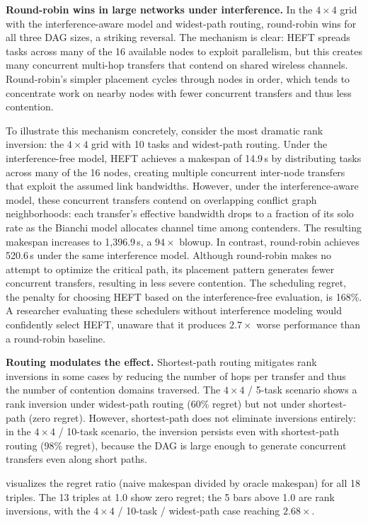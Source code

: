 \documentclass[conference]{IEEEtran}
\begin{document}
\textbf{Round-robin wins in large networks under interference.}
In the $4\times4$ grid with the interference-aware model and widest-path routing,
round-robin wins for all three DAG sizes, a striking reversal.  The
mechanism is clear: HEFT spreads tasks across many of the 16 available
nodes to exploit parallelism, but this creates many concurrent multi-hop
transfers that contend on shared wireless channels.  Round-robin's simpler
placement cycles through nodes in order, which tends to concentrate work
on nearby nodes with fewer concurrent transfers and thus less contention.

To illustrate this mechanism concretely, consider the most dramatic rank
inversion: the $4\times4$ grid with 10 tasks and widest-path routing.
Under the interference-free model, HEFT achieves a makespan of 14.9\,s by
distributing tasks across many of the 16 nodes, creating multiple concurrent
inter-node transfers that exploit the assumed link bandwidths.  However,
under the interference-aware model, these concurrent transfers contend on overlapping
conflict graph neighborhoods: each transfer's effective bandwidth drops to
a fraction of its solo rate as the Bianchi model allocates channel time
among contenders.  The resulting makespan increases to
1,396.9\,s, a $94\times$ blowup.  In contrast, round-robin achieves
520.6\,s under the same interference model.  Although round-robin makes no
attempt to optimize the critical path, its placement pattern generates fewer
concurrent transfers, resulting in less severe contention.  The scheduling
regret, the penalty for choosing HEFT based on the interference-free
evaluation, is 168\%.  A researcher evaluating these schedulers without
interference modeling would confidently select HEFT, unaware that it
produces $2.7\times$ worse performance than a round-robin
baseline.

\textbf{Routing modulates the effect.}  Shortest-path routing mitigates
rank inversions in some cases by reducing the number of hops per transfer
and thus the number of contention domains traversed.  The $4\times4$ /
5-task scenario shows a rank inversion under widest-path routing (60\%
regret) but not under shortest-path (zero regret).  However, shortest-path
does not eliminate inversions entirely: in the $4\times4$ / 10-task
scenario, the inversion persists even with shortest-path routing (98\%
regret), because the DAG is large enough to generate concurrent transfers
even along short paths.

 visualizes the regret ratio (naive makespan
divided by oracle makespan) for all 18 triples.  The 13 triples at 1.0
show zero regret; the 5 bars above 1.0 are rank inversions, with the
$4\times4$ / 10-task / widest-path case reaching $2.68\times$.
\end{document}
